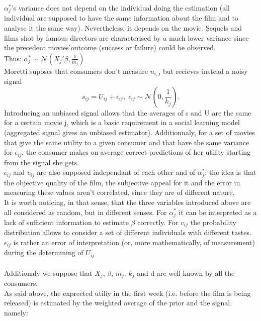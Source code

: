 	$\alpha_{j}^{*}$'s variance does not depend on the individual doing the estimation (all individual are supposed to have the same information about the film and to analyse it the same way). Nevertheless, it depends on the movie. Sequels and films shot by famous directors are characterised by a much lower variance since the precedent movies'outcome (success or failure) could be observed.\\
	Thus: $\alpha_{j}^{*}\sim \mathcal{N}(X_{j}'\beta,\frac{1}{m_{j}})$\\
	
	Moretti suposes that consumers don't measure $u_{i,j}$ but recieves instead a noisy signal
	\begin{equation*}
		s_{i j}=U_{i j}+\epsilon_{i j}, \;\epsilon_{i j}\sim \mathcal{N}(0,\frac{1}{k_{j}}).
	\end{equation*}
	Introducing an unbiased signal allows that the averages of s and U are the same for a certain movie j, which is a basic requirement in a social learning model (aggregated signal gives an unbiased estimator). Additionnaly, for a set of movies that give the same utility to a given consumer and that have the same variance for $\epsilon_{i j}$, the consumer makes on average correct predictions of her utility starting from the signal she gets. \\
	$\epsilon_{i j}$ and $v_{i j}$ are also supposed independant of each other and of $\alpha_{j}^{*}$; the idea is that the objective quality of the film, the subjective appeal for it and the error in measuring these values aren't correlated, since they are of different nature.\\
	It is worth noticing, in that sense, that the three variables introduced above are all considered as random, but in different senses. For  $\alpha_{j}^{*}$ it can be interpreted as a lack of sufficient information to estimate $\beta$ correctly. For $v_{i j}$ the probability distribution allows to consider a set of different individuals with different tastes. $\epsilon_{i j}$ is rather an error of interpretation (or, more mathematically, of measurement) during the determining of $U_{i j}$\\\\
	Additionaly we suppose that $X_{j}$, $\beta$, $m_{j}$, $k_{j}$ and d are well-known by all the consumers.
	\\
	As said above, the exprected utiliy in the first week (i.e. before the film is being released) is estimated by the weighted average of the prior and the signal, namely:
